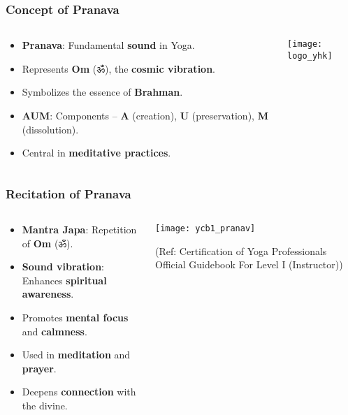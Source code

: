 \begin{frame}[fragile]\frametitle{Concept of Pranava}
\begin{columns}
    \begin{column}[T]{0.5\linewidth}
      \begin{itemize}
        \item \textbf{Pranava}: Fundamental \textbf{sound} in Yoga.
        \item Represents \textbf{Om} (ॐ), the \textbf{cosmic vibration}.
        \item Symbolizes the essence of \textbf{Brahman}.
        \item \textbf{AUM}: Components – \textbf{A} (creation), \textbf{U} (preservation), \textbf{M} (dissolution).
        \item Central in \textbf{meditative practices}.
      \end{itemize}
    \end{column}
    \begin{column}[T]{0.5\linewidth}
        \begin{center}
        \texttt{[image: logo\_yhk]}
        \end{center}	
    \end{column}
\end{columns}
\end{frame}

\begin{frame}[fragile]\frametitle{Recitation of Pranava}
\begin{columns}
    \begin{column}[T]{0.5\linewidth}
      \begin{itemize}
        \item \textbf{Mantra Japa}: Repetition of \textbf{Om} (ॐ).
        \item \textbf{Sound vibration}: Enhances \textbf{spiritual awareness}.
        \item Promotes \textbf{mental focus} and \textbf{calmness}.
        \item Used in \textbf{meditation} and \textbf{prayer}.
        \item Deepens \textbf{connection} with the divine.
      \end{itemize}
    \end{column}
    \begin{column}[T]{0.5\linewidth}
        \begin{center}
        \texttt{[image: ycb1\_pranav]}

		{\tiny (Ref: Certification  of Yoga Professionals Official Guidebook For Level I (Instructor))}		
        \end{center}	
    \end{column}
\end{columns}
\end{frame}

